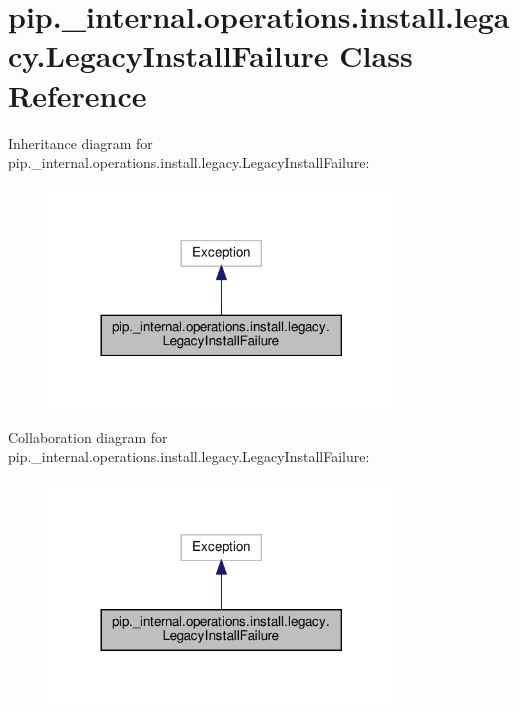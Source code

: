 \hypertarget{classpip_1_1__internal_1_1operations_1_1install_1_1legacy_1_1LegacyInstallFailure}{}\section{pip.\+\_\+internal.\+operations.\+install.\+legacy.\+Legacy\+Install\+Failure Class Reference}
\label{classpip_1_1__internal_1_1operations_1_1install_1_1legacy_1_1LegacyInstallFailure}


Inheritance diagram for pip.\+\_\+internal.\+operations.\+install.\+legacy.\+Legacy\+Install\+Failure\+:
\nopagebreak
\begin{figure}[H]
\begin{center}
\leavevmode
\includegraphics[width=260pt]{classpip_1_1__internal_1_1operations_1_1install_1_1legacy_1_1LegacyInstallFailure__inherit__graph}
\end{center}
\end{figure}


Collaboration diagram for pip.\+\_\+internal.\+operations.\+install.\+legacy.\+Legacy\+Install\+Failure\+:
\nopagebreak
\begin{figure}[H]
\begin{center}
\leavevmode
\includegraphics[width=260pt]{classpip_1_1__internal_1_1operations_1_1install_1_1legacy_1_1LegacyInstallFailure__coll__graph}
\end{center}
\end{figure}
